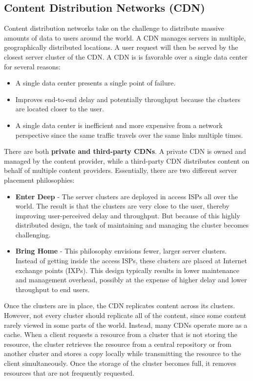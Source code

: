 \subsection{Content Distribution Networks (CDN)}
Content distribution networks take on the challenge to distribute massive amounts of data to users around the world. A CDN manages servers in multiple, geographically distributed locations. A user request will then be served by the closest server cluster of the CDN. A CDN is is favorable over a single data center for several reasons:
\begin{itemize}
\item A single data center presents a single point of failure.
\item Improves end-to-end delay and potentially throughput because the clusters are located closer to the user.
\item A single data center is inefficient and more expensive from a network perspective since the same traffic travels over the same links multiple times.
\end{itemize}
There are both \textbf{private and third-party CDNs}. A private CDN is owned and managed by the content provider, while a third-party CDN distributes content on behalf of multiple content providers. Essentially, there are two different server placement philosophies:
\begin{itemize}
\item \textbf{Enter Deep} - The server clusters are deployed in access ISPs all over the world. The result is that the clusters are very close to the user, thereby improving user-perceived delay and throughput. But because of this highly distributed design, the task of maintaining and managing the cluster becomes challenging.
\item \textbf{Bring Home} - This philosophy envisions fewer, larger server clusters. Instead of getting inside the access ISPs, these clusters are placed at Internet exchange points (IXPs). This design typically results in lower maintenance and management overhead, possibly at the expense of higher delay and lower throughput to end users.
\end{itemize}
Once the clusters are in place, the CDN replicates content across its clusters. However, not every cluster should replicate all of the content, since some content rarely viewed in some parts of the world. Instead, many CDNs operate more as a cache. When a client requests a resource from a cluster that is not storing the resource, the cluster retrieves the resource from a central repository or from another cluster and stores a copy locally while transmitting the resource to the client simultaneously. Once the storage of the cluster becomes full, it removes resources that are not frequently requested. \vspace{.3cm}

